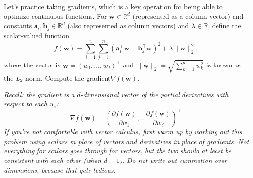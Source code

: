 \item {}

Let's practice taking gradients, which is a key operation for being able to
optimize continuous functions. For $\mathbf w \in \mathbb R^d$ (represented as a
column vector) and constants $\mathbf a_i, \mathbf b_j \in \mathbb R^d$ (also
represented as column vectors) and $\lambda \in \mathbb R$, define the
scalar-valued function
$$f(\mathbf w) = \sum_{i=1}^n \sum_{j=1}^n (\mathbf a_i^\top \mathbf w - \mathbf b_j^\top \mathbf w)^2 + \lambda \|\mathbf w\|_2^2,$$
where the vector is $\mathbf w = (w_1, \dots, w_d)^\top$ and
$\|\mathbf w\|_2 = \sqrt{\sum_{k=1}^d w_k^2}$ is known as the $L_2$ norm.
Compute the gradient$\nabla f(\mathbf w)$.

{\em Recall: the gradient is a $d$-dimensional vector of the partial derivatives
with respect to each $w_i$:
$$\nabla f(\mathbf w) = \left(\frac{\partial f(\mathbf w)}{\partial w_1}, \dots \frac{\partial f(\mathbf w)}{\partial w_d}\right)^\top.$$
If you're not comfortable with vector calculus, first warm up by working out
this problem using scalars in place of vectors and derivatives in place of
gradients. Not everything for scalars goes through for vectors, but the two
should at least be consistent with each other (when $d=1$). Do not write out
summation over dimensions, because that gets tedious.}
